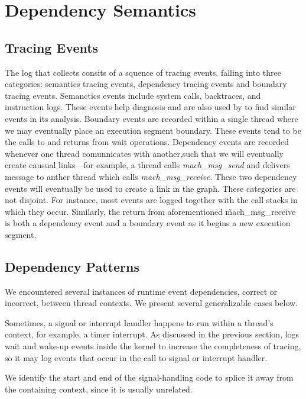 \section{Dependency Semantics}
\label{sec:dependency-semantics}
\subsection{Tracing Events}
The log that \xxx collects consits of a squence of tracing events, falling into
three categories: semantics tracing events, dependency tracing events and
boundary tracing events.  Semanctics events include system calls, backtraces,
and instruction logs.  These events help diagnosis and are also used by \xxx to
find similar events in its analysis.  Boundary events are recorded within a
single thread where we may eventually place an execution segment boundary.
These events tend to be the calls to and returns from wait operations.
Dependency events are recorded whenever one thread comunnicates with
another,such that we will eventually create causual links---for example, a
thread calls \textit{mach\_msg\_send} and delivers message to anther thread
which calls \textit{mach\_msg\_receive}. These two dependency events will
eventually be used to create a link in the graph.  These categories are not
disjoint.  For instance, most events are logged together with the call stacks
in which they occur.  Similarly, the return from aforementioned
\v{mach\_msg\_receive} is both a dependency event and a boundary event as it
begins a new execution segment.

\subsection{Dependency Patterns}
\label{sec:patterns}
We encountered several instances of runtime event dependencies, correct or
incorrect, between thread contexts. We present several generalizable cases
below.


Sometimes, a signal or interrupt handler happens to run within a thread's
context, for example, a timer interrupt.  As discussed in the previous section,
\xxx logs wait and wake-up events inside the kernel to increase the
completeness of tracing, so it may log events that occur in the call to signal
or interrupt handler.

We identify the start and end of the signal-handling code to splice it away
from the containing context, since it is usually unrelated.

